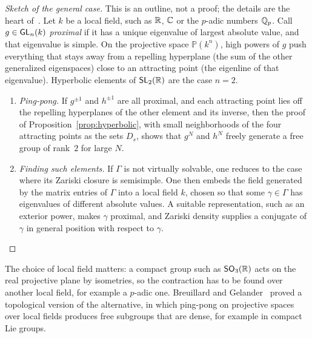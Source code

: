 \begin{proof}[Sketch of the general case]
This is an outline, not a proof; the details are the heart
of~\cite{tits-1972}. Let $k$ be a local field, such as $\mathbb{R}$, $\mathbb{C}$ or the
$p$-adic numbers $\mathbb{Q}_p$. Call $g \in \mathsf{GL}_n(k)$ \emph{proximal} if it has a
unique eigenvalue of largest absolute value, and that eigenvalue is simple.
On the projective space $\mathbb{P}(k^n)$, high powers of $g$ push everything
that stays away from a repelling hyperplane (the sum of the other generalized
eigenspaces) close to an attracting point (the eigenline of that
eigenvalue). Hyperbolic elements of $\mathsf{SL}_2(\mathbb{R})$ are the case $n = 2$.
\begin{enumerate}
\item \emph{Ping-pong.} If $g^{\pm1}$ and $h^{\pm1}$ are all proximal, and each
attracting point lies off the repelling hyperplanes of the other element and
its inverse, then the proof of Proposition~\ref{prop:hyperbolic}, with small
neighborhoods of the four attracting points as the sets $D_s$, shows that
$g^N$ and $h^N$ freely generate a free group of rank~$2$ for large $N$.
\item \emph{Finding such elements.} If $\Gamma$ is not virtually solvable, one
reduces to the case where its Zariski closure is semisimple. One then embeds
the field generated by the matrix entries of $\Gamma$ into a local field $k$,
chosen so that some $\gamma \in \Gamma$ has eigenvalues of different absolute
values. A suitable representation, such as an exterior power, makes $\gamma$
proximal, and Zariski density supplies a conjugate of $\gamma$ in general
position with respect to $\gamma$. \qedhere
\end{enumerate}
\end{proof}

The choice of local field matters: a compact group such as $\mathsf{SO}_3(\mathbb{R})$ acts
on the real projective plane by isometries, so the contraction has to be found
over another local field, for example a $p$-adic one. Breuillard and Gelander~\cite{breuillard-gelander-2007} proved a
topological version of the alternative, in which ping-pong on projective
spaces over local fields produces free subgroups that are dense, for example
in compact Lie groups.

